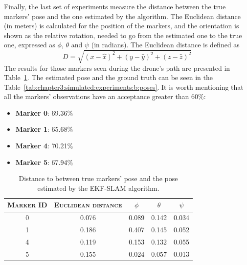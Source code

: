 Finally, the last set of experiments measure the distance between the true markers' pose and the one estimated by the algorithm. The Euclidean distance (in meters) is calculated for the position of the markers, and the orientation is shown as the relative rotation, needed to go from the estimated one to the true one, expressed as $\phi$, $\theta$ and $\psi$ (in radians). The Euclidean distance is defined as\\
\begin{equation*}
    D = \sqrt{(x - \hat{x})^2 + (y - \hat{y})^2 + (z - \hat{z})^2}
\end{equation*}
The results for those markers seen during the drone's path are presented in Table~\ref{tab:chapter3:simulated:experiments:b:distance}. The estimated pose and the ground truth can be seen in the Table~\ref{tab:chapter3:simulated:experiments:b:poses}. It is worth mentioning that all the markers' observations have an acceptance greater than 60\%:
\begin{itemize}
    \item{\textbf{Marker 0}: 69.36\%}
    \item{\textbf{Marker 1}: 65.68\%}
    \item{\textbf{Marker 4}: 70.21\%}
    \item{\textbf{Marker 5}: 67.94\%}
\end{itemize}

\begin{table}
    \centering
    \begin{tabular}{ccccc}
        \toprule
        \textsc{Marker ID} & \textsc{Euclidean distance} & \textsc{$\phi$} & \textsc{$\theta$} & \textsc{$\psi$} \\
        \midrule
        0 & 0.076 & 0.089 & 0.142 & 0.034\\
        1 & 0.186 & 0.407 & 0.145 & 0.052\\
        4 & 0.119 & 0.153 & 0.132 & 0.055\\
        5 & 0.155 & 0.024 & 0.057 & 0.013\\
        \bottomrule
    \end{tabular}
    \caption[Distance to true markers' pose]{Distance to between true markers' pose and the pose estimated by the EKF-SLAM algorithm.}
    \label{tab:chapter3:simulated:experiments:b:distance}
\end{table}

